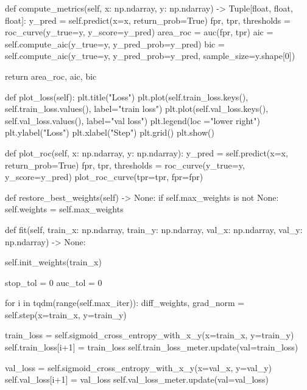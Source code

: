 \documentclass[14pt, a4paper]{article}
\theoremstyle{sltheorem}
\theoremstyle{soltheorem}
\begin{document}
\begin{python}
        
    def compute_metrics(self, x: np.ndarray, y: np.ndarray) -> Tuple[float, float, float]:
        y_pred = self.predict(x=x, return_prob=True)
        fpr, tpr, thresholds = roc_curve(y_true=y, y_score=y_pred)
        area_roc = auc(fpr, tpr)
        aic = self.compute_aic(y_true=y, y_pred_prob=y_pred)
        bic = self.compute_aic(y_true=y, y_pred_prob=y_pred, sample_size=y.shape[0])
        
        return area_roc, aic, bic
    
    
    def plot_loss(self):
        plt.title("Loss")
        plt.plot(self.train_loss.keys(), self.train_loss.values(), label="train loss")
        plt.plot(self.val_loss.keys(), self.val_loss.values(), label="val loss")
        plt.legend(loc ="lower right")
        plt.ylabel("Loss")
        plt.xlabel("Step")
        plt.grid()
        plt.show()
        
        
    def plot_roc(self, x: np.ndarray, y: np.ndarray):
        y_pred = self.predict(x=x, return_prob=True)
        fpr, tpr, thresholds = roc_curve(y_true=y, y_score=y_pred)
        plot_roc_curve(tpr=tpr, fpr=fpr)
        
    def restore_best_weights(self) -> None:
        if self.max_weights is not None:
            self.weights = self.max_weights
    
    
    def fit(self, train_x: np.ndarray, train_y: np.ndarray, val_x: np.ndarray, val_y: np.ndarray) -> None:
        
        self.init_weights(train_x)
        
        stop_tol = 0
        auc_tol = 0
        
        for i in tqdm(range(self.max_iter)):
            diff_weights, grad_norm = self.step(x=train_x, y=train_y)
            
            train_loss = self.sigmoid_cross_entropy_with_x_y(x=train_x, y=train_y)
            self.train_loss[i+1] = train_loss
            self.train_loss_meter.update(val=train_loss)
            
            val_loss = self.sigmoid_cross_entropy_with_x_y(x=val_x, y=val_y)
            self.val_loss[i+1] = val_loss
            self.val_loss_meter.update(val=val_loss)
            


\end{python}
\end{document}
